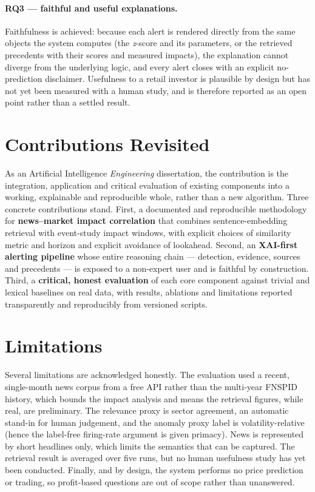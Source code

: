 \paragraph{RQ3 --- faithful and useful explanations.}
Faithfulness is achieved: because each alert is rendered directly from the same objects the system
computes (the \emph{z}-score and its parameters, or the retrieved precedents with their scores and
measured impacts), the explanation cannot diverge from the underlying logic, and every alert closes
with an explicit no-prediction disclaimer. Usefulness to a retail investor is plausible by design but
has not yet been measured with a human study, and is therefore reported as an open point rather than a
settled result.

\section{Contributions Revisited}
\label{sec:concl_contributions}

As an Artificial Intelligence \emph{Engineering} dissertation, the contribution is the integration,
application and critical evaluation of existing components into a working, explainable and
reproducible whole, rather than a new algorithm. Three concrete contributions stand. First, a
documented and reproducible methodology for \textbf{news--market impact correlation} that combines
sentence-embedding retrieval with event-study impact windows, with explicit choices of similarity
metric and horizon and explicit avoidance of lookahead. Second, an \textbf{XAI-first alerting
pipeline} whose entire reasoning chain --- detection, evidence, sources and precedents --- is exposed
to a non-expert user and is faithful by construction. Third, a \textbf{critical, honest evaluation} of
each core component against trivial and lexical baselines on real data, with results, ablations and
limitations reported transparently and reproducibly from versioned scripts.

\section{Limitations}
\label{sec:concl_limitations}

Several limitations are acknowledged honestly. The evaluation used a recent, single-month news corpus
from a free API rather than the multi-year FNSPID history, which bounds the impact analysis and means
the retrieval figures, while real, are preliminary. The relevance proxy is sector agreement, an
automatic stand-in for human judgement, and the anomaly proxy label is volatility-relative (hence the
label-free firing-rate argument is given primacy). News is represented by short headlines only, which
limits the semantics that can be captured. The retrieval result is averaged over five runs, but no
human usefulness study has yet been conducted. Finally, and by design, the system performs no price
prediction or
trading, so profit-based questions are out of scope rather than unanswered.


